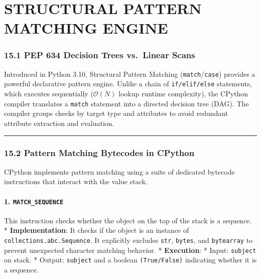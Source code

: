\hypertarget{structural-pattern-matching-engine}{%
\chapter{STRUCTURAL PATTERN MATCHING
ENGINE}\label{structural-pattern-matching-engine}}

\hypertarget{pep-634-decision-trees-vs.-linear-scans}{%
\subsection{15.1 PEP 634 Decision Trees vs.~Linear
Scans}\label{pep-634-decision-trees-vs.-linear-scans}}

Introduced in Python 3.10, Structural Pattern Matching
(\passthrough{\lstinline!match!}/\passthrough{\lstinline!case!})
provides a powerful declarative pattern engine. Unlike a chain of
\passthrough{\lstinline!if/elif/else!} statements, which executes
sequentially (\(\mathcal{O}(N)\) lookup runtime complexity), the CPython
compiler translates a \passthrough{\lstinline!match!} statement into a
directed decision tree (DAG). The compiler groups checks by target type
and attributes to avoid redundant attribute extraction and evaluation.

\begin{center}\rule{0.5\linewidth}{0.5pt}\end{center}

\hypertarget{pattern-matching-bytecodes-in-cpython}{%
\subsection{15.2 Pattern Matching Bytecodes in
CPython}\label{pattern-matching-bytecodes-in-cpython}}

CPython implements pattern matching using a suite of dedicated bytecode
instructions that interact with the value stack.

\hypertarget{match_sequence}{%
\subsubsection{\texorpdfstring{1.
\texttt{MATCH\_SEQUENCE}}{1. MATCH\_SEQUENCE}}\label{match_sequence}}

This instruction checks whether the object on the top of the stack is a
sequence. * \textbf{Implementation}: It checks if the object is an
instance of \passthrough{\lstinline!collections.abc.Sequence!}. It
explicitly excludes \passthrough{\lstinline!str!},
\passthrough{\lstinline!bytes!}, and \passthrough{\lstinline!bytearray!}
to prevent unexpected character matching behavior. * \textbf{Execution}:
* Input: \passthrough{\lstinline!subject!} on stack. * Output:
\passthrough{\lstinline!subject!} and a boolean
\passthrough{\lstinline!(True/False)!} indicating whether it is a
sequence.

